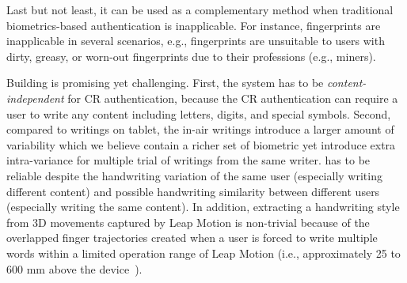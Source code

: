 Last but not least, it can be used as a complementary method when traditional biometrics-based authentication is inapplicable. For instance, fingerprints are inapplicable in several scenarios, e.g., fingerprints are unsuitable to users with dirty, greasy, or worn-out fingerprints due to their professions (e.g., miners). 


Building \CiT is promising yet challenging. First, the system has to be \textit{content-independent} for CR authentication, because the CR authentication can require a user to write any content including letters, digits, and special symbols. Second, compared to writings on tablet, the in-air writings introduce a larger amount of variability which we believe contain a richer set of biometric yet introduce extra intra-variance for multiple trial of writings from the same writer. %
\CiT has to be reliable despite the handwriting variation of the same user (especially writing different content) and possible handwriting similarity between different users (especially writing the same content). %
In addition, extracting a  handwriting style from 3D movements captured by Leap Motion is non-trivial because of the overlapped finger trajectories created when a user is forced to write multiple words within a limited operation range of Leap Motion (i.e., approximately 25 to 600 mm above the device~\cite{LeapOnlineOverview}). 







